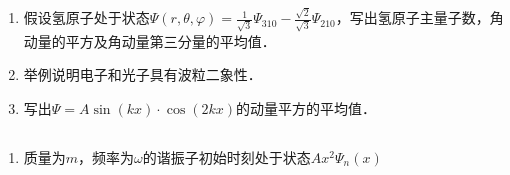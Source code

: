 
\subsection{ }
\begin{enumerate}
\item 假设氢原子处于状态$\Psi (r,\theta,\varphi)=\frac{1}{\sqrt{3}}\Psi_{310}-\frac{\sqrt{2}}{\sqrt{3}}\Psi_{210}$，写出氢原子主量子数，角动量的平方及角动量第三分量的平均值．
\item 举例说明电子和光子具有波粒二象性．
\item 写出$\Psi = A \sin(kx)\cdot\cos(2kx)$的动量平方的平均值．
\end{enumerate}
\subsection{ }
\begin{enumerate}
\item 质量为$m$，频率为$\omega$的谐振子初始时刻处于状态$Ax^2\Psi_n(x)$
\end{enumerate}